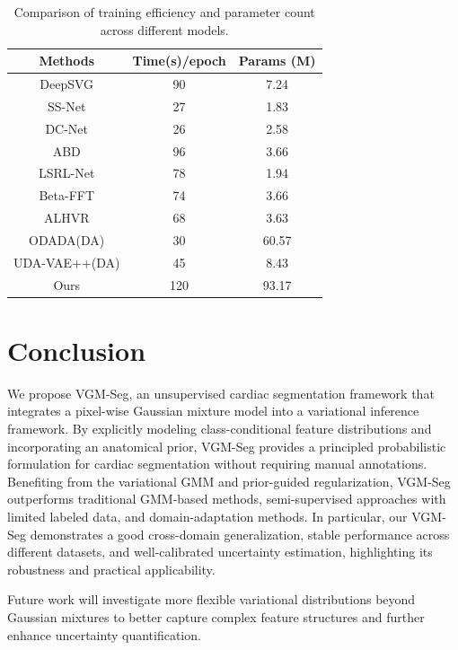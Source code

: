 \documentclass[preprint,12pt]{elsarticle}
\begin{document}
\begin{table}[htpb]
    \centering
    \begin{tabular}{c|c|c}
    \toprule
  Methods & Time(s)/epoch & Params (M)\\
\hline
DeepSVG	& 90  &  7.24\\ 
SS-Net	& 27 & 1.83\\ 
DC-Net	& 26 & 2.58\\ 
ABD	& 96  & 3.66\\ 
LSRL-Net	& 78  & 1.94\\ 
Beta-FFT	& 74  & 3.66\\ 
ALHVR	& 68  & 3.63\\ 
ODADA(DA)	& 30  & 60.57\\ 
UDA-VAE++(DA)	& 45  & 8.43\\ 
Ours	& 120 & 93.17\\ 
\bottomrule
    \end{tabular}
  \caption{Comparison of training efficiency and parameter count across different models. }
    \label{tab:cost}
\end{table}


\section{Conclusion}
We propose VGM-Seg, an unsupervised cardiac segmentation framework that integrates a pixel-wise Gaussian mixture model into a variational inference framework. By explicitly modeling class-conditional feature distributions and incorporating an anatomical prior, VGM-Seg provides a principled probabilistic formulation for cardiac segmentation without requiring manual annotations. Benefiting from the variational GMM and prior-guided regularization, VGM-Seg outperforms traditional GMM-based methods, semi-supervised approaches with limited labeled data, and domain-adaptation methods. In particular, our VGM-Seg demonstrates a good cross-domain generalization, stable performance across different datasets, and well-calibrated uncertainty estimation, highlighting its robustness and practical applicability.


Future work will investigate more flexible variational distributions beyond Gaussian mixtures to better capture complex feature structures and further enhance uncertainty quantification.




 

\end{document}
